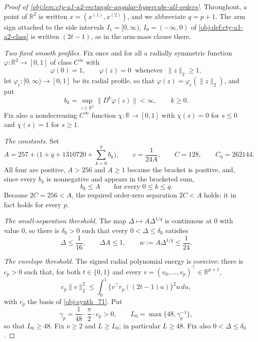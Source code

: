 \begin{proof}[Proof of \cref{obj:lem:cty-a1-a2-rectangle-angular-hypercube-all-orders}]
Throughout, a point of \(\mathbb R^2\) is written \(x=(x^{(1)},x^{(2)})\), and we abbreviate \(q=p+1\).  The arm sign attached to the side intervals \(I_1=[0,\infty)\), \(I_0=(-\infty,0)\) of \cref{obj:def:cty-a1-a2-class} is written \((2t-1)\), as in the arm-mass clause there.

\emph{Two fixed smooth profiles.}
Fix once and for all a radially symmetric function \(\varphi:\mathbb R^2\to[0,1]\) of class \(C^\infty\) with
\[
\varphi(0)=1,
\qquad
\varphi(z)=0\ \text{ whenever }\ \lVert z\rVert_2\geq 1,
\]
let \(\varphi_{\mathrm r}:[0,\infty)\to[0,1]\) be its radial profile, so that \(\varphi(z)=\varphi_{\mathrm r}(\lVert z\rVert_2)\), and put
\[
b_k=\sup_{z\in\mathbb R^2}\lVert D^k\varphi(z)\rVert<\infty,
\qquad k\geq 0 .
\]
Fix also a nondecreasing \(C^\infty\) function \(\chi:\mathbb R\to[0,1]\) with \(\chi(s)=0\) for \(s\leq0\) and \(\chi(s)=1\) for \(s\geq1\).

\emph{The constants.}
Set
\[
A=257+\bigl(1+q+1310720+\sum_{k=0}^{q}b_k\bigr),
\qquad
c=\frac1{24A},
\qquad
C=128,
\qquad
C_0=262144 .
\]
All four are positive, \(A>256\) and \(A\geq1\) because the bracket is positive, and, since every \(b_k\) is nonnegative and appears in the bracketed sum,
\[
b_k\leq A
\qquad\text{for every }0\leq k\leq q .
\]
Because \(2C=256<A\), the required order-zero separation \(2C<A\) holds; it in fact holds for every \(p\).

\emph{The small-separation threshold.}
The map \(\Delta\mapsto A\Delta^{1/q}\) is continuous at \(0\) with value \(0\), so there is \(\delta_0>0\) such that every \(0<\Delta\leq\delta_0\) satisfies
\[
\Delta\leq\frac1{16},
\qquad
\Delta A\leq1,
\qquad
w:=A\Delta^{1/q}\leq\frac1{24}.
\]

\emph{The envelope threshold.}
The signed radial polynomial energy is coercive: there is \(c_p>0\) such that, for both \(t\in\{0,1\}\) and every \(v=(v_0,\ldots,v_p)^\top\in\mathbb R^{p+1}\),
\[
c_p\lVert v\rVert_2^2
\leq
\int_0^1\bigl\{v^\top r_p((2t-1)u)\bigr\}^2 u\,du ,
\]
with \(r_p\) the basis of \cref{obj:synth_71}.
Put
\[
\gamma_p=\frac1{48}\cdot\frac\pi2\cdot c_p>0,
\qquad
L_0=\max\{48,\gamma_p^{-1}\},
\]
so that \(L_0\geq48\).
Fix \(\nu\geq2\) and \(L\geq L_0\); in particular \(L\geq48\).  Fix also \(0<\Delta\leq\delta_0\).


\end{proof}
